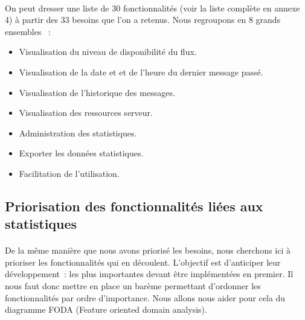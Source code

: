 			\paragraph{}%
			On peut dresser une liste de 30 fonctionnalités (voir la liste
			complète en annexe 4) à partir des 33 besoins que l'on a retenus. Nous
			regroupons en 8 grands ensembles \label{ensembles_fonctios}~:
			\begin{itemize}
			  \item Visualisation du niveau de disponibilité du flux.
			  \item Visualisation de la date et et de l'heure du dernier message passé.
			  \item Visualisation de l’historique des messages.
			  \item Visualisation des ressources serveur.
			  \item Administration des statistiques.
			  \item Exporter les données statistiques.
			  \item Facilitation de l’utilisation.
			\end{itemize}
			
		\subsection{Priorisation des fonctionnalités liées aux statistiques}
			\paragraph{}%
			De la même manière que nous avons priorisé les besoins, nous cherchons ici à
			prioriser les fonctionnalités qui en découlent. L'objectif est
			d'anticiper leur développement~: les plus importantes
			devant être implémentées en premier. Il nous faut donc mettre en place un
			barème permettant d'ordonner les fonctionnalités par ordre d'importance. Nous
			allons nous aider pour cela du diagramme FODA (Feature oriented domain
			analysis).
			
